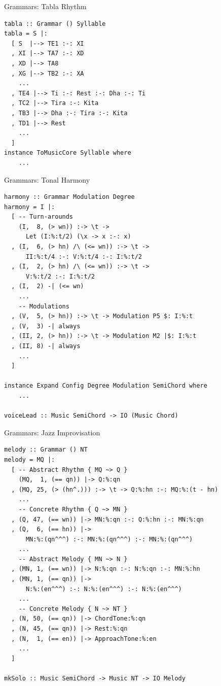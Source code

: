 \documentclass{beamer}
\begin{document}
	\begin{frame}[fragile=singleslide]{Grammars: Tabla Rhythm}
	\begin{verbatim}
tabla :: Grammar () Syllable
tabla = S |:
  [ S  |--> TE1 :-: XI
  , XI |--> TA7 :-: XD
  , XD |--> TA8
  , XG |--> TB2 :-: XA
    ...
  , TE4 |--> Ti :-: Rest :-: Dha :-: Ti
  , TC2 |--> Tira :-: Kita
  , TB3 |--> Dha :-: Tira :-: Kita
  , TD1 |--> Rest
    ...
  ]
instance ToMusicCore Syllable where
    ...
	\end{verbatim}
	\end{frame}
	
	\begin{frame}[fragile=singleslide]{Grammars: Tonal Harmony}
	\begin{verbatim}
harmony :: Grammar Modulation Degree
harmony = I |:
  [ -- Turn-arounds
    (I,  8, (> wn)) :-> \t ->
      Let (I:%:t/2) (\x -> x :-: x)
  , (I,  6, (> hn) /\ (<= wn)) :-> \t ->
      II:%:t/4 :-: V:%:t/4 :-: I:%:t/2
  , (I,  2, (> hn) /\ (<= wn)) :-> \t ->
      V:%:t/2 :-: I:%:t/2
  , (I,  2) -| (<= wn)
    ...
    -- Modulations
  , (V,  5, (> hn)) :-> \t -> Modulation P5 $: I:%:t
  , (V,  3) -| always
  , (II, 2, (> hn)) :-> \t -> Modulation M2 |$: I:%:t
  , (II, 8) -| always
    ...
  ]

instance Expand Config Degree Modulation SemiChord where
    ...

voiceLead :: Music SemiChord -> IO (Music Chord)
	\end{verbatim}
	\end{frame}	
	
	\begin{frame}[fragile=singleslide]{Grammars: Jazz Improvisation}
	\begin{verbatim}
melody :: Grammar () NT
melody = MQ |:
  [ -- Abstract Rhythm { MQ ~> Q }
    (MQ,  1, (== qn)) |-> Q:%:qn
  , (MQ, 25, (> (hn^.))) :-> \t -> Q:%:hn :-: MQ:%:(t - hn)
    ...
    -- Concrete Rhythm { Q ~> MN }
  , (Q, 47, (== wn)) |-> MN:%:qn :-: Q:%:hn :-: MN:%:qn
  , (Q,  6, (== hn)) |->
      MN:%:(qn^^^) :-: MN:%:(qn^^^) :-: MN:%:(qn^^^)
    ...
    -- Abstract Melody { MN ~> N }
  , (MN, 1, (== wn)) |-> N:%:qn :-: N:%:qn :-: MN:%:hn
  , (MN, 1, (== qn)) |->
      N:%:(en^^^) :-: N:%:(en^^^) :-: N:%:(en^^^)
    ...
    -- Concrete Melody { N ~> NT }
  , (N, 50, (== qn)) |-> ChordTone:%:qn
  , (N, 45, (== qn)) |-> Rest:%:qn
  , (N,  1, (== en)) |-> ApproachTone:%:en
    ...
  ]

mkSolo :: Music SemiChord -> Music NT -> IO Melody
    \end{verbatim}
	\end{frame}
	
\end{document}
